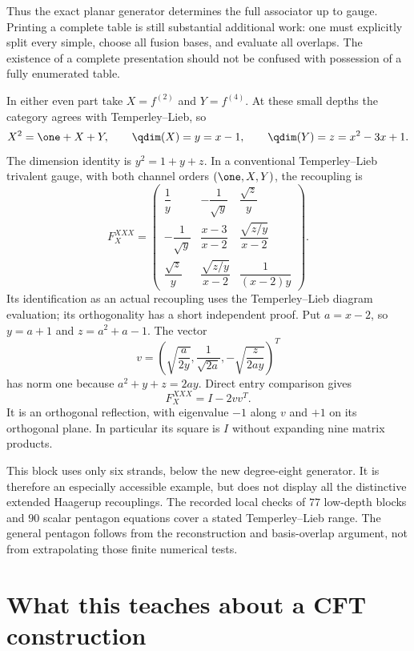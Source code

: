 Thus the exact planar generator determines the full associator
up to gauge. Printing a complete table is still substantial
additional work: one must explicitly split every simple, choose
all fusion bases, and evaluate all overlaps. The existence of
a complete presentation should not be confused with possession
of a fully enumerated table.

\begin{example}
In either even part take $X=f^{(2)}$ and $Y=f^{(4)}$.
At these small depths the category agrees with Temperley--Lieb,
so
\[
 X^2=\one+X+Y,\qquad
 \qdim(X)=y=x-1,\qquad \qdim(Y)=z=x^2-3x+1.
\]
The dimension identity is $y^2=1+y+z$. In a conventional
Temperley--Lieb trivalent gauge, with both channel orders
$(\one,X,Y)$, the recoupling is
\begin{equation}
 F^{XXX}_X=
 \begin{pmatrix}
 \dfrac1y&-\dfrac1{\sqrt y}&\dfrac{\sqrt z}{y}\\[4pt]
 -\dfrac1{\sqrt y}&\dfrac{x-3}{x-2}&
                   \dfrac{\sqrt{z/y}}{x-2}\\[4pt]
 \dfrac{\sqrt z}{y}&\dfrac{\sqrt{z/y}}{x-2}&
                   \dfrac1{(x-2)y}
 \end{pmatrix}.
 \label{eq:EH-small-F}
\end{equation}
Its identification as an actual recoupling uses the
Temperley--Lieb diagram evaluation; its orthogonality has a
short independent proof. Put $a=x-2$, so
$y=a+1$ and $z=a^2+a-1$. The vector
\[
 v=\left(\sqrt{\frac{a}{2y}},\frac1{\sqrt{2a}},
             -\sqrt{\frac{z}{2ay}}\right)^T
\]
has norm one because
$a^2+y+z=2ay$. Direct entry comparison gives
\[
 F^{XXX}_X=I-2vv^T.
\]
It is an orthogonal reflection, with eigenvalue $-1$ along
$v$ and $+1$ on its orthogonal plane. In particular its square
is $I$ without expanding nine matrix products.
\end{example}

This block uses only six strands, below the new degree-eight
generator. It is therefore an especially accessible example,
but does not display all the distinctive extended Haagerup
recouplings. The recorded local checks of $77$ low-depth blocks
and $90$ scalar pentagon equations cover a stated
Temperley--Lieb range. The general pentagon follows from the
reconstruction and basis-overlap argument, not from extrapolating
those finite numerical tests.

\section{What this teaches about a CFT construction}

